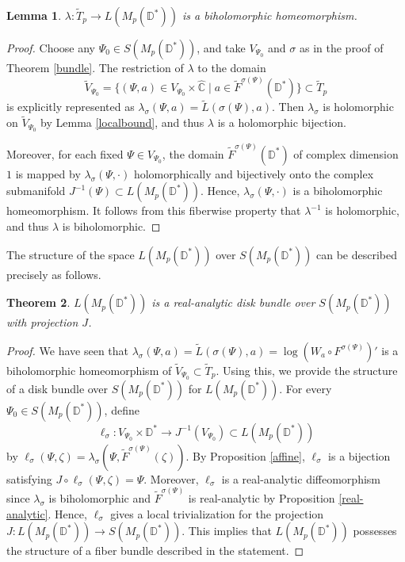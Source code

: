 \documentclass[amstex,12pt,reqno]{amsart}
\newtheorem{theorem}{Theorem}[section]
\newtheorem{lemma}[theorem]{Lemma}
\theoremstyle{definition}
\begin{document}
\begin{lemma}
$\lambda:\widetilde T_p \to L(M_p(\mathbb D^*))$ is a biholomorphic homeomorphism.
\end{lemma}

\begin{proof}
Choose any $\Psi_0 \in S(M_p(\mathbb D^*))$, and take $V_{\Psi_0}$ and $\sigma$ as in the proof of Theorem \ref{bundle}.
The restriction of $\lambda$ to the domain
\[
\widetilde V_{\Psi_0}=\{(\Psi,a) \in V_{\Psi_0} \times \widehat{\mathbb C} \mid 
a \in \widetilde F^{\sigma(\Psi)}(\mathbb D^*)\} \subset \widetilde T_p
\]
is explicitly represented as 
$\lambda_\sigma(\Psi,a)=\widetilde L(\sigma(\Psi),a)$. Then
$\lambda_\sigma$ is holomorphic on $\widetilde V_{\Psi_0}$ by 
Lemma \ref{localbound}, and thus $\lambda$ is a holomorphic bijection. 

Moreover, for each fixed $\Psi \in V_{\Psi_0}$, the domain $\widetilde F^{\sigma(\Psi)}(\mathbb D^*)$ of complex dimension $1$
is mapped by $\lambda_\sigma(\Psi,\cdot)$
holomorphically and bijectively onto the complex submanifold $J^{-1}(\Psi) \subset L(M_p(\mathbb D^*))$.
Hence, $\lambda_\sigma(\Psi,\cdot)$ is a biholomorphic homeomorphism.
It follows from this fiberwise property 
that $\lambda^{-1}$ is holomorphic, and thus $\lambda$ is biholomorphic.
\end{proof}

The structure of the space $L(M_p(\mathbb D^*))$ over $S(M_p(\mathbb D^*))$ can be described precisely as follows.

\begin{theorem}\label{bundle2}
$L(M_p(\mathbb D^*))$ is a real-analytic disk bundle over $S(M_p(\mathbb D^*))$ with projection $J$.
\end{theorem}

\begin{proof}
We have seen that $\lambda_\sigma(\Psi,a)=\widetilde L(\sigma(\Psi),a)=\log (W_a \circ F^{\sigma(\Psi)})'$ is a biholomorphic homeomorphism of $\widetilde V_{\Psi_0} \subset \widetilde T_p$.
Using this, we provide the structure of a disk bundle over $S(M_p(\mathbb D^*))$ for $L(M_p(\mathbb D^*))$.
For every $\Psi_0 \in S(M_p(\mathbb D^*))$, define
$$
\ell_\sigma:V_{\Psi_0} \times \mathbb D^* \to J^{-1}(V_{\Psi_0}) \subset L(M_p(\mathbb D^*))
$$
by
$\ell_\sigma(\Psi, \zeta)=\lambda_\sigma(\Psi,\widetilde F^{\sigma(\Psi)}(\zeta))$. 
By Proposition \ref{affine}, $\ell_\sigma$ is a bijection satisfying 
$J \circ \ell_\sigma(\Psi,\zeta)=\Psi$.
Moreover, $\ell_\sigma$ is a real-analytic diffeomorphism since $\lambda_\sigma$ is biholomorphic and
$\widetilde F^{\sigma(\Psi)}$ is real-analytic by Proposition \ref{real-analytic}.
Hence, $\ell_\sigma$ gives a local trivialization for the projection 
$J:L(M_p(\mathbb D^*)) \to S(M_p(\mathbb D^*))$. 
This implies that $L(M_p(\mathbb D^*))$ possesses the structure of
a fiber bundle described in the statement.
\end{proof}
\end{document}
